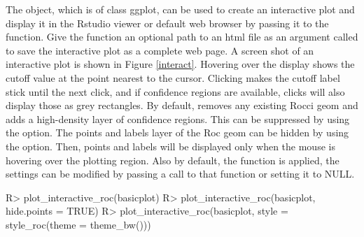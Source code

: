 \documentclass[codesnippet]{jss}
\begin{document}
The  object, which is of class ggplot, can be used to
create an interactive plot and display it in the Rstudio viewer or
default web browser by passing it to the 
function. Give the function an optional path to an html file as an
argument called  to save the interactive plot as a complete
web page. A screen shot of an interactive plot is shown in Figure
\ref{interact}. Hovering over the display shows the cutoff value at the
point nearest to the cursor. Clicking makes the cutoff label stick until
the next click, and if confidence regions are available, clicks will
also display those as grey rectangles. By default,
 removes any existing Rocci geom and adds a
high-density layer of confidence regions. This can be suppressed by
using the  option. The points and labels layer of
the Roc geom can be hidden by using the 
option. Then, points and labels will be displayed only when the mouse is
hovering over the plotting region. Also by default, the 
function is applied, the settings can be modified by passing a call to
that function or setting it to NULL.

\begin{Schunk}
\begin{Sinput}
R> plot_interactive_roc(basicplot)
R> plot_interactive_roc(basicplot, hide.points = TRUE)
R> plot_interactive_roc(basicplot, style = style_roc(theme = theme_bw()))
\end{Sinput}
\end{Schunk}
\end{document}
